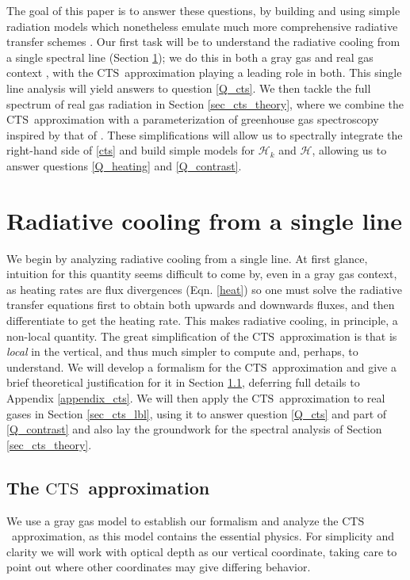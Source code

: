 \documentclass[10pt]{article}
\newcommand{\ch}{\ensuremath{\mathcal{H}}}
\newcommand{\CTS}{\ensuremath{\mathrm{CTS}}}
\begin{document}
The goal of this paper is to answer these questions, by building and using simple radiation models which nonetheless emulate much more comprehensive radiative transfer schemes \citep[see][for further discussion of this approach]{jeevanjee2017a}. Our first task will be to understand the radiative cooling from a single spectral line (Section \ref{sec_single_line}); we do this in both a gray gas and real gas context , with the \CTS\ approximation playing a leading role in both. This single line analysis will yield answers to question \ref{Q_cts}. We then tackle the full spectrum of real gas radiation in Section \ref{sec_cts_theory}, where we combine the \CTS\ approximation with a parameterization of greenhouse gas spectroscopy inspired by that of \cite{wilson2012}. These simplifications will allow us to spectrally integrate the right-hand side of \eqref{cts} and build simple models for $\ch_k$ and \ch, allowing us to answer questions \ref{Q_heating} and \ref{Q_contrast}.

\section{Radiative cooling from a single line} \label{sec_single_line}
We begin by analyzing radiative cooling from a single line. At first glance, intuition for this quantity  seems difficult to come by, even in a gray gas context, as heating rates are flux divergences (Eqn. \ref{heat}) so one must solve the radiative transfer equations first to obtain both upwards and downwards fluxes, and then differentiate to get the heating rate. This makes radiative cooling, in principle, a non-local quantity. The great simplification of the \CTS\ approximation is that  is \emph{local} in the vertical, and thus much simpler to compute and, perhaps, to understand. We will develop a formalism for the \CTS\ approximation and give a brief theoretical justification for it in Section \ref{sec_cts_gray},  deferring full details to Appendix \ref{appendix_cts}. We will then apply the \CTS\ approximation to real gases in Section \ref{sec_cts_lbl}, using it to answer question \ref{Q_cts} and part of \ref{Q_contrast} and also lay the groundwork for the spectral analysis of Section \ref{sec_cts_theory}.

 
\subsection{The \CTS\ approximation} \label{sec_cts_gray}
We use a gray gas model \citep{pierrehumbert2010} to establish our formalism and analyze the \CTS\ approximation, as this model contains the essential physics. For simplicity and clarity we will work with optical depth   as our vertical coordinate, taking care to point out where other coordinates may give differing behavior. 
\end{document}
